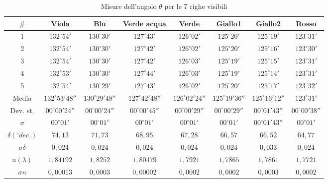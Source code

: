 \documentclass{article}
\begin{document}
\begin{table}[h!]
\centering
\begin{tabular}{ | c | c | c | c | c | c | c | c | }
  \hline
   $\#$ & Viola & Blu & Verde acqua & Verde & Giallo1 & Giallo2 & Rosso \\
  \hline
  1 & $132^{\circ} 54'$ & $130^{\circ} 30'$ & $127^{\circ} 43'$ & $126^{\circ} 02'$ & $125^{\circ} 20'$ &  $125^{\circ} 19'$ &  $123^{\circ} 31'$ \\
  2 & $132^{\circ} 54'$ & $130^{\circ} 30'$ & $127^{\circ} 42'$ & $126^{\circ} 02'$ & $125^{\circ} 20'$ &  $125^{\circ} 16'$ &  $123^{\circ} 30'$ \\
  3 & $132^{\circ} 54'$ & $130^{\circ} 30'$ & $127^{\circ} 42'$ & $126^{\circ} 03'$ & $125^{\circ} 19'$ &  $125^{\circ} 15'$ &  $123^{\circ} 31'$ \\
  4 & $132^{\circ} 53'$ & $130^{\circ} 30'$ & $127^{\circ} 44'$ & $126^{\circ} 03'$ & $125^{\circ} 19'$ &  $125^{\circ} 14'$ &  $123^{\circ} 31'$ \\
  5 & $132^{\circ} 54'$ & $130^{\circ} 29'$ & $127^{\circ} 43'$ & $126^{\circ} 02'$ & $125^{\circ} 20'$ &  $125^{\circ} 17'$ &  $123^{\circ} 32'$ \\
  \hline
  Media & $132^{\circ} 53' 48''$ & $130^{\circ} 29' 48''$ & $127^{\circ} 42' 48''$ & $126^{\circ} 02' 24''$ & $125^{\circ} 19' 36''$ &  $125^{\circ} 16' 12''$ &  $123^{\circ} 31'$ \\
  Dev. st. & $00^{\circ} 00' 24''$ & $00^{\circ} 00' 24''$ & $00^{\circ} 00' 45''$ & $00^{\circ} 00' 29''$ & $00^{\circ} 00' 29''$ & $00^{\circ} 01' 43''$ & $00^{\circ} 00' 38''$ \\
  $\sigma$ &  $00^{\circ} 01'$ & $00^{\circ} 01'$ & $00^{\circ} 01'$ & $00^{\circ} 01'$ & $00^{\circ} 01'$ & $00^{\circ} 01' 43''$ & $00^{\circ} 01'$ \\
  \hline
  $\delta (^{\circ} dec.)$ & $74,13$ & $71,73$ & $68,95$ & $67,28$ & $66,57$ & $66,52$ & $64,77$ \\
  $\sigma \delta $ & $0,024$ & $0,024$ & $0,024$ & $0,024$ & $0,024$ & $0,033$ & $0,024$ \\
  \hline
  $n (\lambda)$ & $1,84192$ & $1,8252$ & $1,80479$ & $1,7921$ & $1,7865$ & $1,7861$ & $1,7721$ \\
  $\sigma n$ & $0,00013$ & $0,0003$ & $0,00002$ & $0,0002$ & $0,0002$ & $0,0003$ & $0,0002$ \\
  \hline
\end{tabular}
  \caption{Misure dell'angolo $\theta$ per le 7 righe visibili}
  \label{table:1}
\end{table}
\end{document}
